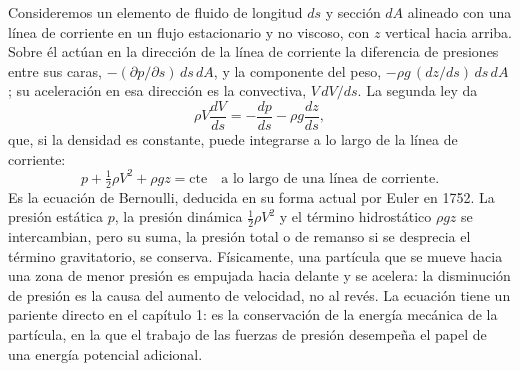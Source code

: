 \documentclass[10pt,openany]{book}
\begin{document}
Consideremos un elemento de fluido de longitud \(ds\) y sección \(dA\) alineado con una línea de corriente en un flujo estacionario y no viscoso, con \(z\) vertical hacia arriba. Sobre él actúan en la dirección de la línea de corriente la diferencia de presiones entre sus caras, \(-(\partial p/\partial s)\,ds\,dA\), y la componente del peso, \(-\rho g\,(dz/ds)\,ds\,dA\); su aceleración en esa dirección es la convectiva, \(V\,dV/ds\). La segunda ley da
\begin{equation}
\rho V\frac{dV}{ds} = -\frac{dp}{ds} - \rho g\frac{dz}{ds}, \label{eq:c12-euler-s}
\end{equation}
que, si la densidad es constante, puede integrarse a lo largo de la línea de corriente:
\begin{equation}
p + \tfrac12\rho V^{2} + \rho g z = \mathrm{cte}\quad \text{a lo largo de una línea de corriente}. \label{eq:c12-bernoulli}
\end{equation}
Es la ecuación de Bernoulli, deducida en su forma actual por Euler en 1752. La presión estática \(p\), la presión dinámica \(\tfrac12\rho V^{2}\) y el término hidrostático \(\rho g z\) se intercambian, pero su suma, la presión total o de remanso si se desprecia el término gravitatorio, se conserva. Físicamente, una partícula que se mueve hacia una zona de menor presión es empujada hacia delante y se acelera: la disminución de presión es la causa del aumento de velocidad, no al revés. La ecuación tiene un pariente directo en el capítulo 1: es la conservación de la energía mecánica de la partícula, en la que el trabajo de las fuerzas de presión desempeña el papel de una energía potencial adicional.
\end{document}
